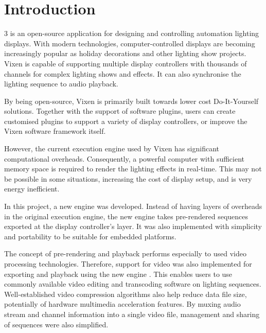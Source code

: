 \chapter{Introduction}
\renewcommand{\baselinestretch}{\mystretch}
\label{chap:Intro}

 3 \cite{vixen} is an open-source application for designing and controlling automation lighting displays. With modern technologies, computer-controlled displays are becoming increasingly popular as holiday decorations and other lighting show projects. Vixen is capable of supporting multiple display controllers with thousands of channels for complex lighting shows and effects. It can also synchronise the lighting sequence to audio playback.

By being open-source, Vixen is primarily built towards lower cost Do-It-Yourself solutions. Together with the support of software plugins, users can create customised plugins to support a variety of display controllers, or improve the Vixen software framework itself.

However, the current execution engine used by Vixen has significant computational overheads. Consequently, a powerful computer with sufficient memory space is required to render the lighting effects in real-time. This may not be possible in some situations, increasing the cost of display setup, and is very energy inefficient.

In this project, a new engine was developed. Instead of having layers of overheads  in the original execution engine, the new engine takes pre-rendered sequences exported at the display controller's layer. It was also implemented with simplicity and portability  to be suitable for embedded platforms.

The concept of pre-rendering and playback performs especially  to  used video processing technologies. Therefore, support for video  was also implemented for exporting and playback using the new engine . This enables users to use commonly available video editing and transcoding software on lighting sequences. Well-established video compression algorithms also help reduce data file size, potentially  of hardware multimedia acceleration features. By muxing audio stream and channel information into a single video file, management and sharing of sequences were also simplified.

